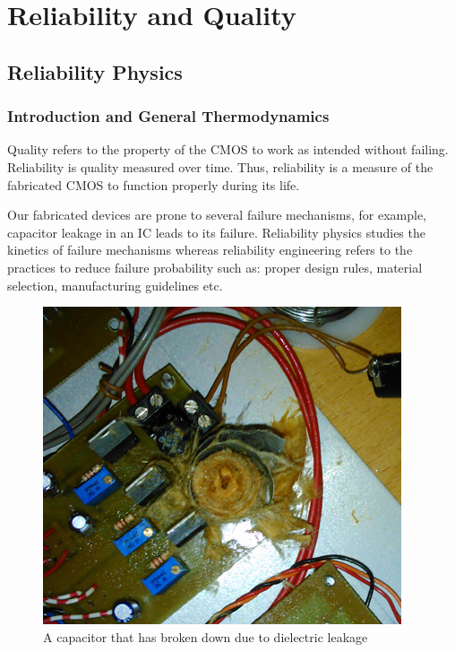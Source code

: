 \chapter{Reliability and Quality }
\section{Reliability Physics}
\subsection{Introduction and General Thermodynamics}
Quality refers to the property of the CMOS to work as intended without failing. Reliability is quality measured over time. Thus, reliability is a measure of the fabricated CMOS to function properly during its life. 

\noindent Our fabricated devices are prone to several failure mechanisms, for example, capacitor leakage in an IC leads to its failure. Reliability physics studies the kinetics of failure mechanisms whereas reliability engineering refers to the practices to reduce failure probability such as: proper design rules, material selection, manufacturing guidelines etc.

\begin{figure}[htb]
\centering
\includegraphics[scale=0.6]{./fig26} %
\caption{A capacitor that has broken down due to dielectric leakage}
\label{3.26} %
\end{figure}

